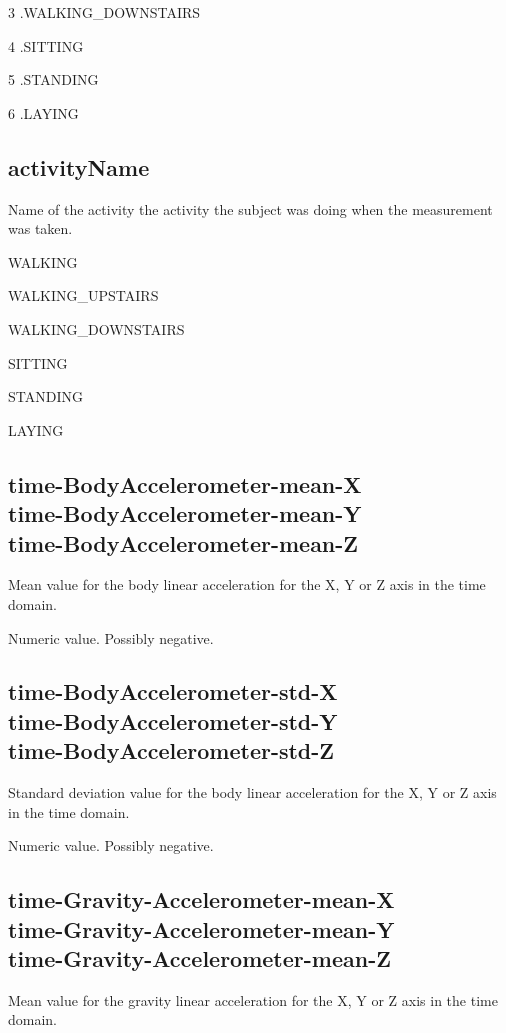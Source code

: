 \documentclass[a4paper,10pt]{report}
\begin{document}
   3 .WALKING\_DOWNSTAIRS

   4 .SITTING

   5 .STANDING

   6 .LAYING

\subsection*{activityName} 

Name of the activity the activity the subject was doing when the measurement was taken.

 WALKING

 WALKING\_UPSTAIRS

 WALKING\_DOWNSTAIRS

 SITTING

 STANDING

 LAYING

\subsection*{time-BodyAccelerometer-mean-X\\time-BodyAccelerometer-mean-Y\\time-BodyAccelerometer-mean-Z} 

Mean value for the body linear acceleration for the X, Y or Z axis in the time domain.

Numeric value. Possibly negative.

\subsection*{time-BodyAccelerometer-std-X\\time-BodyAccelerometer-std-Y\\time-BodyAccelerometer-std-Z} 

Standard deviation value for the body linear acceleration for the X, Y or Z axis in the time domain.

Numeric value. Possibly negative.

\subsection*{time-Gravity-Accelerometer-mean-X\\time-Gravity-Accelerometer-mean-Y\\time-Gravity-Accelerometer-mean-Z} 

Mean value for the gravity linear acceleration for the X, Y or Z axis in the time domain.
\end{document}
